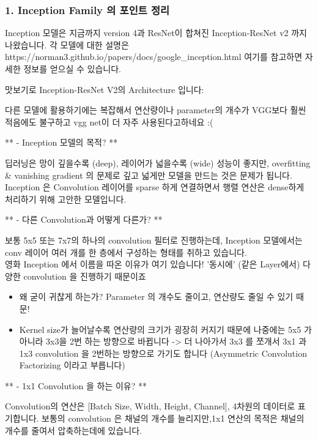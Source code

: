 \documentclass[11pt]{article}
\providecommand{\tightlist}{%
      \setlength{\itemsep}{0pt}\setlength{\parskip}{0pt}}
\begin{document}
    \subsubsection{1. Inception Family 의 포인트
정리}\label{inception-family-uxc758-uxd3ecuxc778uxd2b8-uxc815uxb9ac}

Inception 모델은 지금까지 version 4과 ResNet이 합쳐진 Inception-ResNet
v2 까지 나왔습니다. 각 모델에 대한 설명은
https://norman3.github.io/papers/docs/google\_inception.html 여기를
참고하면 자세한 정보를 얻으실 수 있습니다.

맛보기로 Inception-ResNet V2의 Architecture 입니다:

다른 모델에 활용하기에는 복잡해서 연산량이나 parameter의 개수가 VGG보다
훨씬 적음에도 불구하고 vgg net이 더 자주 사용된다고하네요 :(

** - Inception 모델의 목적? **

딥러닝은 망이 깊을수록 (deep), 레이어가 넓을수록 (wide) 성능이 좋지만,
overfitting \& vanishing gradient 의 문제로 깊고 넓게만 모델을 만드는
것은 문제가 됩니다. Inception 은 Convolution 레이어를 sparse 하게
연결하면서 행렬 연산은 dense하게 처리하기 위해 고안한 모델입니다.

** - 다른 Convolution과 어떻게 다른가? **

보통 5x5 또는 7x7의 하나의 convolution 필터로 진행하는데, Inception
모델에서는 conv 레이어 여러 개를 한 층에서 구성하는 형태를 취하고
있습니다.\\
영화 Inception 에서 이름을 따온 이유가 여기 있습니다! '동시에' (같은
Layer에서) 다양한 convolution 을 진행하기 때문이죠

\begin{itemize}
\tightlist
\item
  왜 굳이 귀찮게 하는가? Parameter 의 개수도 줄이고, 연산량도 줄일 수
  있기 때문!
\item
  Kernel size가 늘어날수록 연산량의 크기가 굉장히 커지기 때문에 나중에는
  5x5 가 아니라 3x3을 2번 하는 방향으로 바뀝니다 -\textgreater{} 더
  나아가서 3x3 를 쪼개서 3x1 과 1x3 convolution 을 2번하는 방향으로
  가기도 합니다 (Asymmetric Convolution Factorizing 이라고 부릅니다)
\end{itemize}

** - 1x1 Convolution 을 하는 이유? **

Convolution의 연산은 {[}Batch Size, Width, Height, Channel{]}, 4차원의
데이터로 표기합니다. 보통의 convolution 은 채널의 개수를 늘리지만,1x1
연산의 목적은 채널의 개수를 줄여서 압축하는데에 있습니다.
\end{document}

